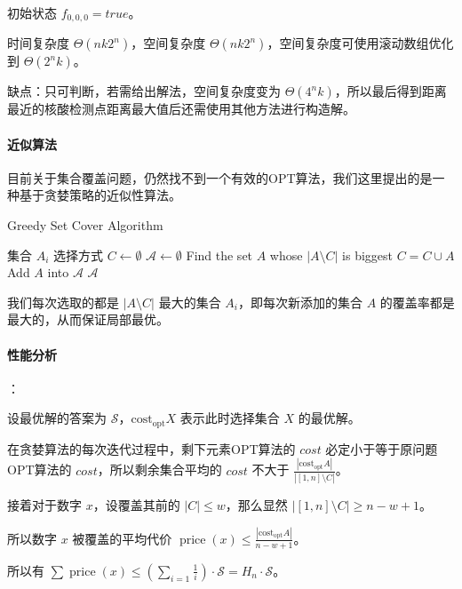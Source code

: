 \documentclass{cumcmthesis}
\begin{document}
初始状态 $f_{0,0,0} = true$。

时间复杂度 $\Theta(nk2^n)$，空间复杂度 $\Theta(nk2^n)$，空间复杂度可使用滚动数组优化到 $\Theta(2^nk)$。

缺点：只可判断，若需给出解法，空间复杂度变为 $\Theta(4^nk)$，所以最后得到距离最近的核酸检测点距离最大值后还需使用其他方法进行构造解。

\paragraph{近似算法}

目前关于集合覆盖问题，仍然找不到一个有效的OPT算法，我们这里提出的是一种基于贪婪策略的近似性算法。


\begin{algorithm}
    \caption{Greedy Set Cover Algorithm}
    \begin{algorithmic}[1]
        \Require 集合 $A_i$
        \Ensure 选择方式
        \State $C \gets \emptyset$
        \State $\mathscr{A} \gets \emptyset$
            \State Find the set $A$ whose $|A\setminus C|$ is biggest
            \State $C = C \cup A$
            \State Add $A$ into $\mathscr{A}$
        \EndWhile
        \State \Return $\mathscr{A}$
    \end{algorithmic}
\end{algorithm}

我们每次选取的都是 $|A\setminus C|$ 最大的集合 $A_i$，即每次新添加的集合 $A$ 的覆盖率都是最大的，从而保证局部最优。

\paragraph{性能分析}：

设最优解的答案为 $\mathscr{S}$，$\operatorname{cost_{opt}}X$ 表示此时选择集合 $X$ 的最优解。

在贪婪算法的每次迭代过程中，剩下元素OPT算法的 $cost$ 必定小于等于原问题OPT算法的 $cost$，所以剩余集合平均的 $cost$ 不大于 $\frac{|\operatorname{cost_{opt}}A|}{|[1,n]\setminus C|}$。

接着对于数字 $x$，设覆盖其前的 $|C| \le w$，那么显然 $|[1,n]\setminus C| \ge n - w + 1$。

所以数字 $x$ 被覆盖的平均代价 $\operatorname{price}(x) \le \frac{|\operatorname{cost_{opt}}A|}{n-w+1}$。

所以有 $\sum \operatorname{price}(x) \le (\sum_{i=1}\frac{1}{i}) \cdot \mathscr{S} = H_n \cdot \mathscr{S}$。
\end{document}
